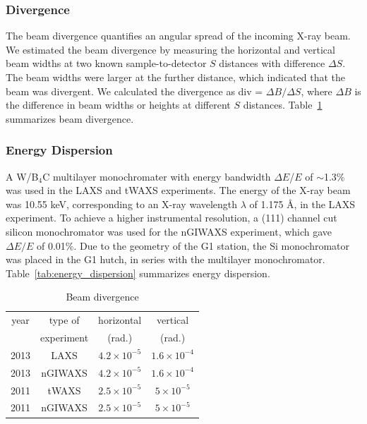 \subsubsection{Divergence}\label{sec:divergence}
The beam divergence quantifies an angular spread of the incoming X-ray
beam. We estimated the beam divergence by measuring the horizontal and 
vertical beam widths at two known sample-to-detector $S$ distances
with difference $\Delta S$. 
The beam widths were larger at the further distance, which indicated 
that the beam was divergent. 
We calculated the divergence as div = $\Delta B/\Delta S$, where
$\Delta B$ is the difference in beam widths or heights 
at different $S$ distances.
Table~\ref{tab:beam_divergence} summarizes beam divergence.

\subsubsection{Energy Dispersion}\label{sec:energy_dispersion}
A W/B$_4$C multilayer monochromater with energy bandwidth $\Delta E$/$E$ of
$\sim$1.3\% was used in the LAXS and tWAXS experiments. 
The energy of the X-ray beam was 10.55 keV, corresponding to an X-ray wavelength 
$\lambda$ of 1.175 \AA, in the LAXS experiment.
To achieve a higher instrumental resolution, 
a (111) channel cut silicon monochromator was used for 
the nGIWAXS experiment, which gave $\Delta E/E$ of 0.01\%.
Due to the geometry of the G1 station, the Si monochromator was placed in
the G1 hutch, in series with the multilayer monochromator. 
Table~\ref{tab:energy_dispersion} summarizes energy dispersion.

\begin{table}[htbp]
  \centering
  \begin{tabular}{cccc}
    \hline
    year & type of  & horizontal & vertical \\
     & experiment & (rad.) & (rad.) \\
    \hline
    2013 & LAXS & $4.2 \times 10^{-5}$ & $1.6 \times 10^{-4}$ \\
    2013 & nGIWAXS & $4.2 \times 10^{-5}$ & $1.6 \times 10^{-4}$ \\
    2011 & tWAXS & $2.5 \times 10^{-5}$ & $5 \times 10^{-5}$ \\
    2011 & nGIWAXS & $2.5 \times 10^{-5}$ & $5 \times 10^{-5}$ \\
    \hline
  \end{tabular}
  \caption[Beam divergence]
  {Beam divergence}
  \label{tab:beam_divergence}
\end{table}

